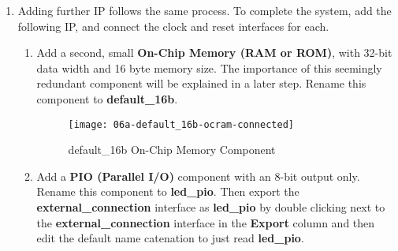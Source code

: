 \begin{flushleft}
\begin{enumerate}[
	label=\textbf{Step \arabic*.},
	leftmargin=*,
	widest={00},
	align=left]
Notice how the Avalon Memory Mapped Slave connection on the on-chip RAM does not yet have an available connection.  That connection will not appear until an IP with a matching Avalon Memory Mapped Master is added, which will be done in a later step.

\newpage

Also note that hovering the mouse over a connection point brings up a tool tip that details the interfaces to be connected.  This can be useful while building larger systems.

\begin{figure}[H]
\centering
\texttt{[image: 05-clk-ocram-rst-tooltip]}
\caption{Connection Point Tooltip Pop-ups}
\label{fig:05-clk-ocram-rst-tooltip}
\end{figure}

\item Adding further IP follows the same process.  To complete the system, add the following IP, and connect the clock and reset interfaces for each.

\begin{enumerate}[
	label=\textbf{Step \arabic{enumi}\alph*.},
	leftmargin=*,
	align=left]

\item Add a second, small \textbf{On-Chip Memory (RAM or ROM)}, with 32-bit data width and 16 byte memory size.  The importance of this seemingly redundant component will be explained in a later step.  Rename this component to \textbf{default\_16b}.

\begin{figure}[H]
\centering
\texttt{[image: 06a-default\_16b-ocram-connected]}
\caption{default\_16b On-Chip Memory Component}
\label{fig:06a-default_16b-ocram-connected}
\end{figure}

\newpage

\item Add a \textbf{PIO (Parallel I/O)} component with an 8-bit output only.  Rename this component to \textbf{led\_pio}.  Then export the \textbf{external\_connection} interface as \textbf{led\_pio} by double clicking next to the \textbf{external\_connection} interface in the \textbf{Export} column and then edit the default name catenation to just read \textbf{led\_pio}.


\end{enumerate}
\end{enumerate}
\end{flushleft}
